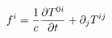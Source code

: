 \documentclass[preview]{standalone}
\begin{document}
\begin{align*}
\special{dvisvgm:raw <g id='unique000'>}f^{i} = \frac{1}{c}\frac{\partial T^{0i}}{\partial t} + \partial_j T^{ij}\special{dvisvgm:raw </g>}
\end{align*}
\end{document}

